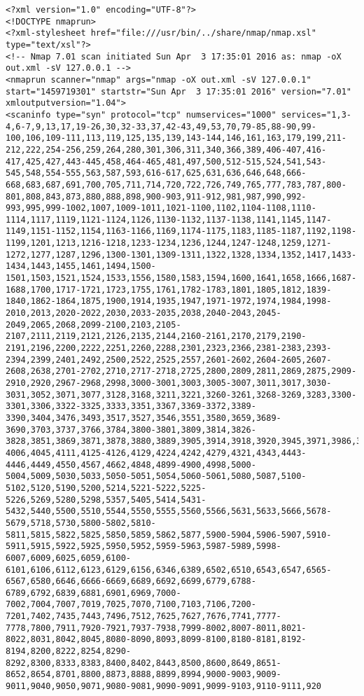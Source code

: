 \documentclass[12pt,a4paper]{report}
\begin{document}
\begin{verbatim}
<?xml version="1.0" encoding="UTF-8"?>
<!DOCTYPE nmaprun>
<?xml-stylesheet href="file:///usr/bin/../share/nmap/nmap.xsl" type="text/xsl"?>
<!-- Nmap 7.01 scan initiated Sun Apr  3 17:35:01 2016 as: nmap -oX out.xml -sV 127.0.0.1 -->
<nmaprun scanner="nmap" args="nmap -oX out.xml -sV 127.0.0.1" start="1459719301" startstr="Sun Apr  3 17:35:01 2016" version="7.01" xmloutputversion="1.04">
<scaninfo type="syn" protocol="tcp" numservices="1000" services="1,3-4,6-7,9,13,17,19-26,30,32-33,37,42-43,49,53,70,79-85,88-90,99-100,106,109-111,113,119,125,135,139,143-144,146,161,163,179,199,211-212,222,254-256,259,264,280,301,306,311,340,366,389,406-407,416-417,425,427,443-445,458,464-465,481,497,500,512-515,524,541,543-545,548,554-555,563,587,593,616-617,625,631,636,646,648,666-668,683,687,691,700,705,711,714,720,722,726,749,765,777,783,787,800-801,808,843,873,880,888,898,900-903,911-912,981,987,990,992-993,995,999-1002,1007,1009-1011,1021-1100,1102,1104-1108,1110-1114,1117,1119,1121-1124,1126,1130-1132,1137-1138,1141,1145,1147-1149,1151-1152,1154,1163-1166,1169,1174-1175,1183,1185-1187,1192,1198-1199,1201,1213,1216-1218,1233-1234,1236,1244,1247-1248,1259,1271-1272,1277,1287,1296,1300-1301,1309-1311,1322,1328,1334,1352,1417,1433-1434,1443,1455,1461,1494,1500-1501,1503,1521,1524,1533,1556,1580,1583,1594,1600,1641,1658,1666,1687-1688,1700,1717-1721,1723,1755,1761,1782-1783,1801,1805,1812,1839-1840,1862-1864,1875,1900,1914,1935,1947,1971-1972,1974,1984,1998-2010,2013,2020-2022,2030,2033-2035,2038,2040-2043,2045-2049,2065,2068,2099-2100,2103,2105-2107,2111,2119,2121,2126,2135,2144,2160-2161,2170,2179,2190-2191,2196,2200,2222,2251,2260,2288,2301,2323,2366,2381-2383,2393-2394,2399,2401,2492,2500,2522,2525,2557,2601-2602,2604-2605,2607-2608,2638,2701-2702,2710,2717-2718,2725,2800,2809,2811,2869,2875,2909-2910,2920,2967-2968,2998,3000-3001,3003,3005-3007,3011,3017,3030-3031,3052,3071,3077,3128,3168,3211,3221,3260-3261,3268-3269,3283,3300-3301,3306,3322-3325,3333,3351,3367,3369-3372,3389-3390,3404,3476,3493,3517,3527,3546,3551,3580,3659,3689-3690,3703,3737,3766,3784,3800-3801,3809,3814,3826-3828,3851,3869,3871,3878,3880,3889,3905,3914,3918,3920,3945,3971,3986,3995,3998,4000-4006,4045,4111,4125-4126,4129,4224,4242,4279,4321,4343,4443-4446,4449,4550,4567,4662,4848,4899-4900,4998,5000-5004,5009,5030,5033,5050-5051,5054,5060-5061,5080,5087,5100-5102,5120,5190,5200,5214,5221-5222,5225-5226,5269,5280,5298,5357,5405,5414,5431-5432,5440,5500,5510,5544,5550,5555,5560,5566,5631,5633,5666,5678-5679,5718,5730,5800-5802,5810-5811,5815,5822,5825,5850,5859,5862,5877,5900-5904,5906-5907,5910-5911,5915,5922,5925,5950,5952,5959-5963,5987-5989,5998-6007,6009,6025,6059,6100-6101,6106,6112,6123,6129,6156,6346,6389,6502,6510,6543,6547,6565-6567,6580,6646,6666-6669,6689,6692,6699,6779,6788-6789,6792,6839,6881,6901,6969,7000-7002,7004,7007,7019,7025,7070,7100,7103,7106,7200-7201,7402,7435,7443,7496,7512,7625,7627,7676,7741,7777-7778,7800,7911,7920-7921,7937-7938,7999-8002,8007-8011,8021-8022,8031,8042,8045,8080-8090,8093,8099-8100,8180-8181,8192-8194,8200,8222,8254,8290-8292,8300,8333,8383,8400,8402,8443,8500,8600,8649,8651-8652,8654,8701,8800,8873,8888,8899,8994,9000-9003,9009-9011,9040,9050,9071,9080-9081,9090-9091,9099-9103,9110-9111,920
\end{verbatim}
\end{document}
